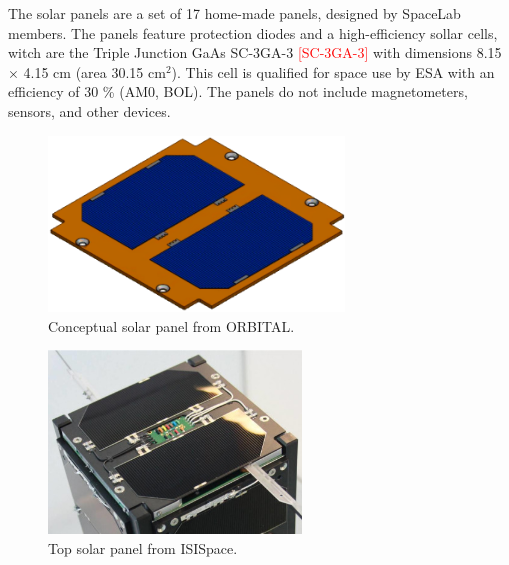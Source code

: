 The solar panels are a set of 17 home-made panels, designed by SpaceLab members. The panels feature protection diodes and a high-efficiency sollar cells, witch are the Triple Junction GaAs SC-3GA-3 \textcolor{red}{[SC-3GA-3]} with dimensions 8.15 $\times$ 4.15 cm (area 30.15 cm$^{2}$). This cell is qualified for space use by ESA with an efficiency of 30 \% (AM0, BOL). The panels do not include magnetometers, sensors, and other devices. 

\begin{figure}[!ht]
    \begin{center}
        \includegraphics[width=0.7\textwidth]{figures/subsystems/orbital-solar-panel}
        \caption{Conceptual solar panel from ORBITAL.}
        \label{fig:solar-panel-orbital}
    \end{center}
\end{figure}

\begin{figure}[!ht]
    \begin{center}
        \includegraphics[width=0.6\textwidth]{figures/subsystems/isis-top-solar-panel}
        \caption{Top solar panel from ISISpace.}
        \label{fig:top-solar-panel}
    \end{center}
\end{figure}

